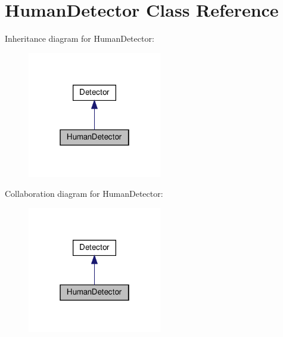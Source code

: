 \hypertarget{classHumanDetector}{}\section{Human\+Detector Class Reference}
\label{classHumanDetector}


Inheritance diagram for Human\+Detector\+:\nopagebreak
\begin{figure}[H]
\begin{center}
\leavevmode
\includegraphics[width=166pt]{classHumanDetector__inherit__graph}
\end{center}
\end{figure}


Collaboration diagram for Human\+Detector\+:\nopagebreak
\begin{figure}[H]
\begin{center}
\leavevmode
\includegraphics[width=166pt]{classHumanDetector__coll__graph}
\end{center}
\end{figure}
